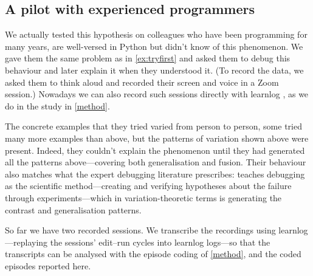 \subsection{A pilot with experienced programmers}
\label{pilot}

We actually tested this hypothesis on colleagues who have been
programming for many years, are well-versed in Python but didn't know of this
phenomenon.
We gave them the same problem as in \cref{ex:tryfirst} and asked them to
debug this behaviour and later explain it when they understood it.
(To record the data, we asked them to think aloud and recorded their screen and
voice in a Zoom session.)
Nowadays we can also record such sessions directly with learnlog
\autocite{learnlog}, as we do in the study in \cref{method}.

The concrete examples that they tried varied from person to person, some tried
many more examples than above, but the patterns of variation shown above were
present.
Indeed, they couldn't explain the phenomenon until they had generated all the
patterns above---covering both generalisation and fusion.
Their behaviour also matches what the expert debugging literature
prescribes: \textcite{WhyProgramsFail} teaches debugging as the
scientific method---creating and verifying hypotheses about the failure
through experiments---which in variation-theoretic terms is generating
the contrast and generalisation patterns.

So far we have two recorded sessions.
We transcribe the recordings using learnlog---replaying the sessions'
edit--run cycles into learnlog logs---so that the transcripts can be
analysed with the episode coding of \cref{method}, and the coded episodes
reported here.


